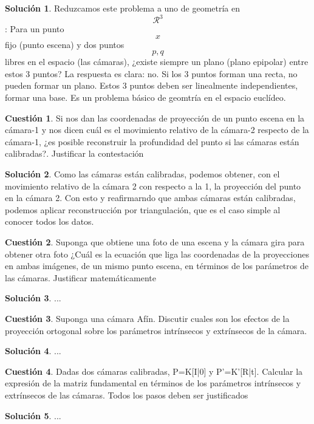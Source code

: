 \documentclass[a4paper, 11pt]{article}
\theoremstyle{definition}
\newtheorem{cuestion}{Cuestión}
\newtheorem*{solucion}{Solución}
\begin{document}
  \begin{solucion}
    Reduzcamos este problema a uno de geometría en $$\mathcal{R}^3$$: Para un
    punto $$x$$ fijo (punto escena) y dos puntos $$p,q$$ libres en el
    espacio (las cámaras), ¿existe siempre un plano (plano epipolar) entre estos 3 puntos?
    La respuesta es clara: no. Si los 3 puntos forman una recta, no pueden formar un plano.
    Estos 3 puntos deben ser linealmente independientes, formar una base. Es un problema
    básico de geomtría en el espacio euclídeo.
  \end{solucion}


  \begin{cuestion}
    Si nos dan las coordenadas de proyección de un punto escena en la cámara-1 y nos dicen
    cuál es el movimiento relativo de la cámara-2 respecto de la cámara-1, ¿es posible reconstruir
    la profundidad del punto si las cámaras están calibradas?. Justificar la contestación
  \end{cuestion}

  \begin{solucion}
     	Como las cámaras están calibradas, podemos obtener, con el movimiento relativo de
      la cámara 2 con respecto a la 1, la proyección del punto en la cámara 2. Con esto
      y reafirmarndo que ambas cámaras están calibradas, podemos aplicar reconstrucción
      por triangulación, que es el caso simple al conocer todos los datos. 
  \end{solucion}
  \begin{cuestion}
    Suponga que obtiene una foto de una escena y la cámara gira para obtener otra foto ¿Cuál
    es la ecuación que liga las coordenadas de la proyecciones en ambas imágenes, de un mismo
    punto escena, en términos de los parámetros de las cámaras. Justificar matemáticamente

  \end{cuestion}

  \begin{solucion}
     	...
  \end{solucion}
  \begin{cuestion}
    Suponga una cámara Afín. Discutir cuales son los efectos de la proyección ortogonal sobre
    los parámetros intrínsecos y extrínsecos de la cámara.

  \end{cuestion}

  \begin{solucion}
     	...
  \end{solucion}

  \begin{cuestion}
    Dadas dos cámaras calibradas, P=K[I|0] y P'=K'[R|t]. Calcular la expresión de la matriz
    fundamental en términos de los parámetros intrínsecos y extrínsecos de las cámaras. Todos los
    pasos deben ser justificados

  \end{cuestion}

  \begin{solucion}
     	...
  \end{solucion}
\end{document}
